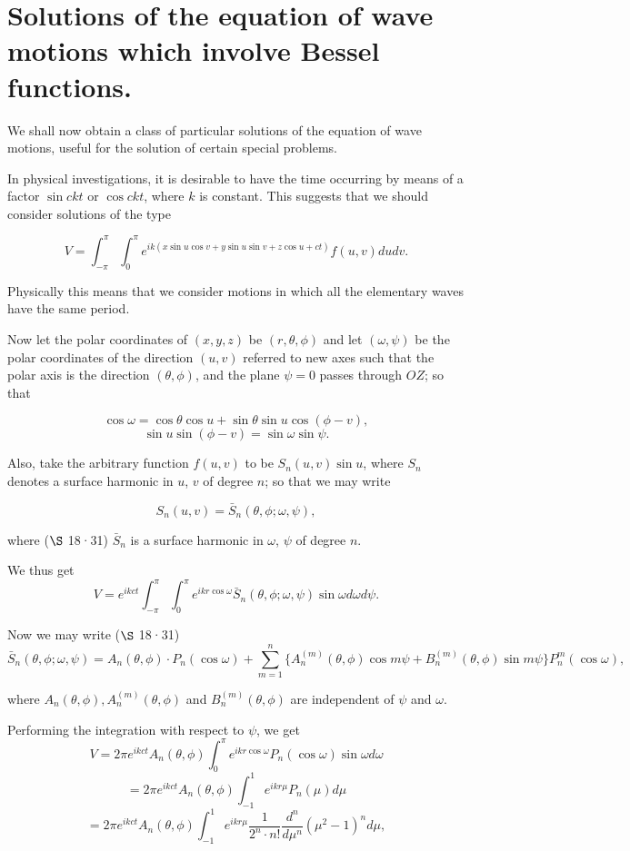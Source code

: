 \documentclass{article}
\begin{document}
\section{Solutions of the equation of wave motions which involve Bessel functions.}

We shall now obtain a class of particular solutions of the equation of wave motions, useful for the solution of certain special problems.

In physical investigations, it is desirable to have the time occurring by means of a factor $\sin ckt$ or $\cos ckt$, where $k$ is constant. This suggests that we should consider solutions of the type

\[V = \int_{-\pi}^{\pi} \int_0^{\pi} e^{ik(x\sin u \cos v + y \sin u \sin v + z \cos u + ct)} f(u, v) dudv.\]

Physically this means that we consider motions in which all the elementary waves have the same period.

Now let the polar coordinates of $(x, y, z)$ be $(r, \theta, \phi)$ and let $(\omega, \psi)$ be the polar coordinates of the direction $(u, v)$ referred to new axes such that the polar axis is the direction $(\theta, \phi)$, and the plane $\psi = 0$ passes through $OZ$; so that

\[\cos \omega = \cos \theta \cos u + \sin \theta \sin u \cos(\phi - v),\]
\[\sin u \sin(\phi - v) = \sin \omega \sin \psi.\]

Also, take the arbitrary function $f(u, v)$ to be $S_n(u, v)\sin u$, where $S_n$ denotes a surface harmonic in $u$, $v$ of degree $n$; so that we may write

\[S_n(u, v) = \bar{S}_n(\theta, \phi; \omega, \psi),\]

where ($\S$ 18·31) $\bar{S}_n$ is a surface harmonic in $\omega$, $\psi$ of degree $n$.

We thus get
\[V = e^{ikct} \int_{-\pi}^{\pi} \int_0^{\pi} e^{ikr \cos \omega} \bar{S}_n (\theta, \phi; \omega, \psi) \sin \omega d\omega d\psi.\]

Now we may write ($\S$ 18·31)
\[\bar{S}_n (\theta, \phi; \omega, \psi) = A_n (\theta, \phi) \cdot P_n (\cos \omega)
+ \sum_{m=1}^n \{A_n^{(m)}(\theta, \phi)\cos m\psi + B_n^{(m)}(\theta, \phi)\sin m\psi\} P_n^m (\cos \omega),\]

where $A_n (\theta, \phi), A_n^{(m)} (\theta, \phi)$ and $B_n^{(m)} (\theta, \phi)$ are independent of $\psi$ and $\omega$.

Performing the integration with respect to $\psi$, we get
\[V = 2\pi e^{ikct} A_n (\theta, \phi) \int_0^{\pi} e^{ikr \cos \omega} P_n (\cos \omega) \sin \omega d\omega\]
\[= 2\pi e^{ikct} A_n (\theta, \phi) \int_{-1}^1 e^{ikr\mu} P_n (\mu) d\mu\]
\[= 2\pi e^{ikct} A_n (\theta, \phi) \int_{-1}^1 e^{ikr\mu} \frac{1}{2^n \cdot n!} \frac{d^n}{d\mu^n} (\mu^2 - 1)^n d\mu,\]
\end{document}
